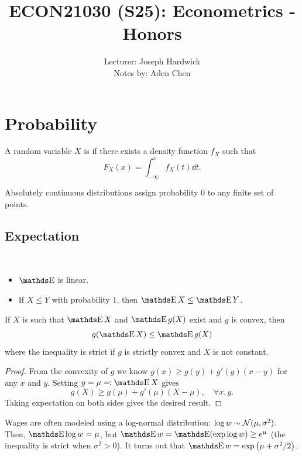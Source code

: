 \documentclass[letterpaper, 10pt]{article}
\title{ECON21030 (S25): Econometrics - Honors}
\author{
  {Lecturer: Joseph Hardwick} \\
  {Notes by: Aden Chen}
}
\begin{document}
\maketitle
\tableofcontents

\section{Probability}
\begin{definition}
  A random variable \(X\) is  if there exists a density function \(f_X\) such that
  \[
    F_X(x) = \int_{-\infty}^{x} f_X(t) \dd t.
  \]
\end{definition}
\begin{remark}
  Absolutely continuous distributions assign probability \(0\) to any finite set of points.
\end{remark}

\subsection{Expectation}
\begin{proposition}~
  \begin{itemize}
    \item \(\E\) is linear.
    \item If \(X \leq Y\) with probability \(1\), then \(\E X \leq \E Y\).
  \end{itemize}
\end{proposition}

\begin{theorem}
  If \(X\) is such that \(\E X\) and \(\E g(X)\) exist and \(g\) is convex, then 
  \[
    g(\E X) \leq \E g(X)
  \] 
  where the inequality is strict if \(g\) is strictly convex and \(X\) is not constant.
\end{theorem}
\begin{proof}
  From the convexity of \(g\) we know \(g(x) \geq g(y) + g'(y)(x - y)\) for any \(x\) and \(y\). 
  Setting \(y = \mu \eqqcolon \E X\) gives 
  \[
    g(X) \geq g(\mu) + g'(\mu)(X - \mu), \quad \forall x, y . 
  \] 
  Taking expectation on both sides gives the desired result. 
\end{proof}
\begin{example}
  Wages are often modeled using a log-normal distribution: \(\log w \sim \mathcal{N}(\mu, \sigma^2)\).
  Then, \(\E \log w = \mu\), but \(\E w = \E(\exp \log w) \geq e^{\mu}\) (the inequality is strict when \(\sigma^2 > 0\)).
  It turns out that \(\E w = \exp\left( \mu + \sigma^2 / 2 \right)\).
\end{example}
\end{document}
